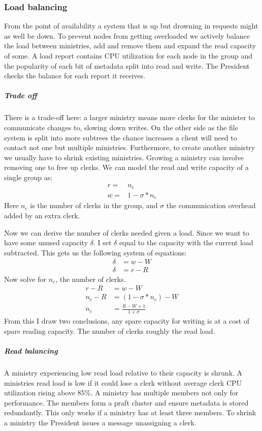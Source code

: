 \subsubsection*{Load balancing} \label{sec:loadb}
From the point of availability a system that is up but drowning in requests might as well be down. To prevent nodes from getting overloaded we actively balance the load between ministries, add and remove them and expand the read capacity of some. A load report contains CPU utilization for each node in the group and the popularity of each bit of metadata split into read and write. The President checks the balance for each report it receives.
%
\subparagraph*{Trade off}
There is a trade-off here: a larger ministry means more clerks for the minister to communicate changes to, slowing down writes. On the other side as the file system is split into more subtrees the chance increases a client will need to contact not one but multiple ministries. Furthermore, to create another ministry we usually have to shrink existing ministries. Growing a ministry can involve removing one to free up clerks. 
%
We can model the read and write capacity of a single group as:
\begin{align}
	r =& n_\text{c} \\
	w =& 1 - \sigma*n_\text{c}
\end{align}%
Here $n_\text{c}$ is the number of clerks in the group, and $\sigma$ the communication overhead added by an extra clerk. 

Now we can derive the number of clerks needed given a load. Since we want to have some unused capacity $\delta$. I set $\delta$ equal to the capacity with the current load subtracted. This gets us the following system of equations: 
\begin{align}
	\delta &= w - W \\
	\delta &= r - R
\end{align}%
Now solve for $n_\text{c}$, the number of clerks.
\begin{align}
	r - R &= w - W \\
	n_c - R &= \left(1 - \sigma*n_c\right) - W \\
	n_c &= \frac{R - W + 1}{1 + \sigma}
\end{align}
From this I draw two conclusions, any spare capacity for writing is at a cost of spare reading capacity. The number of clerks roughly the read load.
%
%
\subparagraph*{Read balancing}
A ministry experiencing low read load relative to their capacity is shrunk. A ministries read load is low if it could lose a clerk without average clerk CPU utilization rising above 85\%. A ministry has multiple members not only for performance. The members form a \ac{praft} cluster and ensure metadata is stored redundantly. This only works if a ministry has at least three members. To shrink a ministry the President issues a \raft{} message unassigning a clerk. 

